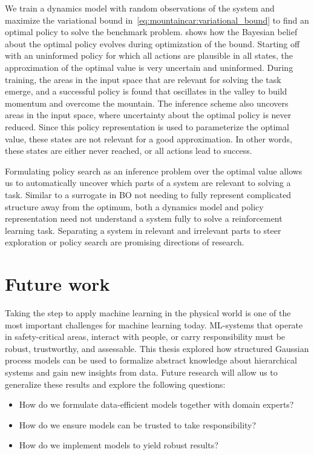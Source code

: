 We train a dynamics model with random observations of the system and maximize the variational bound in~\cref{eq:mountaincar:variational_bound} to find an optimal policy to solve the benchmark problem.
 shows how the Bayesian belief about the optimal policy evolves during optimization of the bound.
Starting off with an uninformed policy for which all actions are plausible in all states, the approximation of the optimal value is very uncertain and uninformed.
During training, the areas in the input space that are relevant for solving the task emerge, and a successful policy is found that oscillates in the valley to build momentum and overcome the mountain.
The inference scheme also uncovers areas in the input space, where uncertainty about the optimal policy is never reduced.
Since this policy representation is used to parameterize the optimal value, these states are not relevant for a good approximation.
In other words, these states are either never reached, or all actions lead to success.

Formulating policy search as an inference problem over the optimal value allows us to automatically uncover which parts of a system are relevant to solving a task.
Similar to a surrogate in BO not needing to fully represent complicated structure away from the optimum, both a dynamics model and policy representation need not understand a system fully to solve a reinforcement learning task.
Separating a system in relevant and irrelevant parts to steer exploration or policy search are promising directions of research.


\section{Future work}
\label{toc:discussion:future_work}
Taking the step to apply machine learning in the physical world is one of the most important challenges for machine learning today.
ML-systems that operate in safety-critical areas, interact with people, or carry responsibility must be robust, trustworthy, and assessable.
This thesis explored how structured Gaussian process models can be used to formalize abstract knowledge about hierarchical systems and gain new insights from data.
Future research will allow us to generalize these results and explore the following questions:
\begin{itemize}
    \item How do we formulate data-efficient models together with domain experts?
    \item How do we ensure models can be trusted to take responsibility?
    \item How do we implement models to yield robust results?
\end{itemize}

